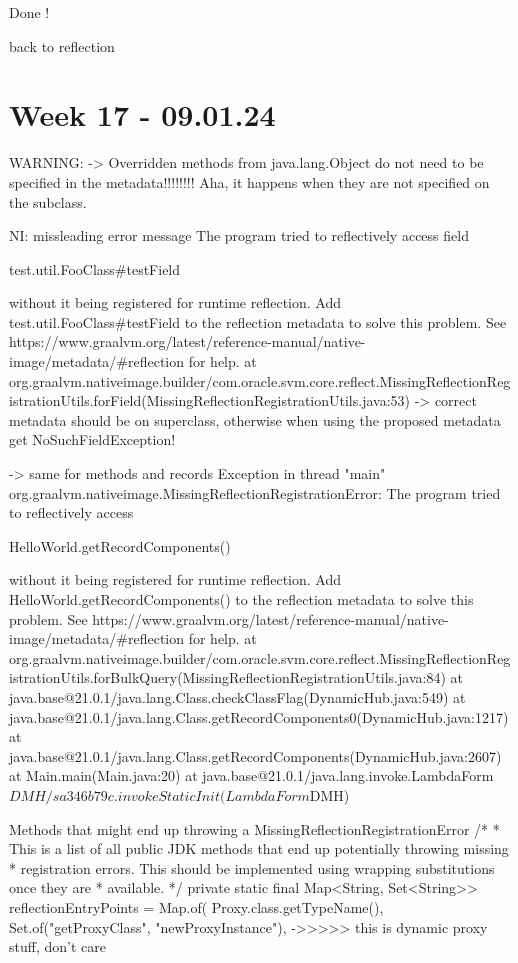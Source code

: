 Done !

back to reflection

\section{Week 17 - 09.01.24}
WARNING:
-> Overridden methods from java.lang.Object do not need to be specified in the metadata!!!!!!!!
Aha, it happens when they are not specified on the subclass.

NI: missleading error message
The program tried to reflectively access field

   test.util.FooClass#testField

 without it being registered for runtime reflection. Add test.util.FooClass#testField to the reflection metadata to solve this problem. See https://www.graalvm.org/latest/reference-manual/native-image/metadata/#reflection for help.
	at org.graalvm.nativeimage.builder/com.oracle.svm.core.reflect.MissingReflectionRegistrationUtils.forField(MissingReflectionRegistrationUtils.java:53)
-> correct metadata should be on superclass, otherwise when using the proposed metadata get NoSuchFieldException!

-> same for methods and records
Exception in thread "main" org.graalvm.nativeimage.MissingReflectionRegistrationError: The program tried to reflectively access

   HelloWorld.getRecordComponents()

 without it being registered for runtime reflection. Add HelloWorld.getRecordComponents() to the reflection metadata to solve this problem. See https://www.graalvm.org/latest/reference-manual/native-image/metadata/#reflection for help.
	at org.graalvm.nativeimage.builder/com.oracle.svm.core.reflect.MissingReflectionRegistrationUtils.forBulkQuery(MissingReflectionRegistrationUtils.java:84)
	at java.base@21.0.1/java.lang.Class.checkClassFlag(DynamicHub.java:549)
	at java.base@21.0.1/java.lang.Class.getRecordComponents0(DynamicHub.java:1217)
	at java.base@21.0.1/java.lang.Class.getRecordComponents(DynamicHub.java:2607)
	at Main.main(Main.java:20)
	at java.base@21.0.1/java.lang.invoke.LambdaForm$DMH/sa346b79c.invokeStaticInit(LambdaForm$DMH)


Methods that might end up throwing a MissingReflectionRegistrationError
    /*
     * This is a list of all public JDK methods that end up potentially throwing missing
     * registration errors. This should be implemented using wrapping substitutions once they are
     * available.
     */
    private static final Map<String, Set<String>> reflectionEntryPoints = Map.of(
                    Proxy.class.getTypeName(), Set.of("getProxyClass", "newProxyInstance"), ->>>>> this is dynamic proxy stuff, don't care


